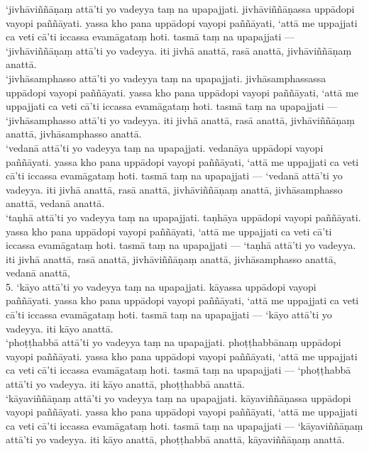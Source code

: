 \documentclass[11pt]{article}
\begin{document}
‘jivhāviññāṇaṃ attā’ti yo vadeyya taṃ na upapajjati. jivhāviññāṇassa uppādopi vayopi paññāyati. yassa kho pana uppādopi vayopi paññāyati, ‘attā me uppajjati ca veti cā’ti iccassa evamāgataṃ hoti. tasmā taṃ na upapajjati — ‘jivhāviññāṇaṃ attā’ti yo vadeyya. iti jivhā anattā, rasā anattā, jivhāviññāṇaṃ anattā.\\

‘jivhāsamphasso attā’ti yo vadeyya taṃ na upapajjati. jivhāsamphassassa uppādopi vayopi paññāyati. yassa kho pana uppādopi vayopi paññāyati, ‘attā me uppajjati ca veti cā’ti iccassa evamāgataṃ hoti. tasmā taṃ na upapajjati — ‘jivhāsamphasso attā’ti yo vadeyya. iti jivhā anattā, rasā anattā, jivhāviññāṇaṃ anattā, jivhāsamphasso anattā.\\

‘vedanā attā’ti yo vadeyya taṃ na upapajjati. vedanāya uppādopi vayopi paññāyati. yassa kho pana uppādopi vayopi paññāyati, ‘attā me uppajjati ca veti cā’ti iccassa evamāgataṃ hoti. tasmā taṃ na upapajjati — ‘vedanā attā’ti yo vadeyya. iti jivhā anattā, rasā anattā, jivhāviññāṇaṃ anattā, jivhāsamphasso anattā, vedanā anattā.\\

‘taṇhā attā’ti yo vadeyya taṃ na upapajjati. taṇhāya uppādopi vayopi paññāyati. yassa kho pana uppādopi vayopi paññāyati, ‘attā me uppajjati ca veti cā’ti iccassa evamāgataṃ hoti. tasmā taṃ na upapajjati — ‘taṇhā attā’ti yo vadeyya. iti jivhā anattā, rasā anattā, jivhāviññāṇaṃ anattā, jivhāsamphasso anattā, vedanā anattā,\\

5. ‘kāyo attā’ti yo vadeyya taṃ na upapajjati. kāyassa uppādopi vayopi paññāyati. yassa kho pana uppādopi vayopi paññāyati, ‘attā me uppajjati ca veti cā’ti iccassa evamāgataṃ hoti. tasmā taṃ na upapajjati — ‘kāyo attā’ti yo vadeyya. iti kāyo anattā.\\

‘phoṭṭhabbā attā’ti yo vadeyya taṃ na upapajjati. phoṭṭhabbānaṃ uppādopi vayopi paññāyati. yassa kho pana uppādopi vayopi paññāyati, ‘attā me uppajjati ca veti cā’ti iccassa evamāgataṃ hoti. tasmā taṃ na upapajjati — ‘phoṭṭhabbā attā’ti yo vadeyya. iti kāyo anattā, phoṭṭhabbā anattā.\\

‘kāyaviññāṇaṃ attā’ti yo vadeyya taṃ na upapajjati. kāyaviññāṇassa uppādopi vayopi paññāyati. yassa kho pana uppādopi vayopi paññāyati, ‘attā me uppajjati ca veti cā’ti iccassa evamāgataṃ hoti. tasmā taṃ na upapajjati — ‘kāyaviññāṇaṃ attā’ti yo vadeyya. iti kāyo anattā, phoṭṭhabbā anattā, kāyaviññāṇaṃ anattā.\\
\end{document}
